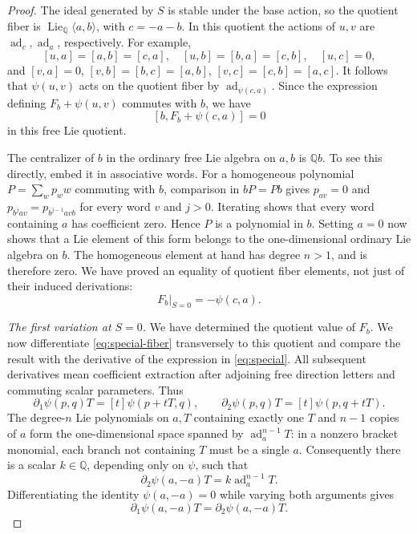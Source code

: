 \documentclass[11pt]{article}
\theoremstyle{definition}
\theoremstyle{remark}
\numberwithin{equation}{section}
\begin{document}
\begin{proof}
The ideal generated by \(S\) is stable under the base action, so the
quotient fiber is \(\operatorname{Lie}_{\mathbb Q}\langle a,b\rangle\), with
\(c=-a-b\).  In this quotient the actions of \(u,v\) are
\(\operatorname{ad}_c,\operatorname{ad}_a\), respectively.  For example,
\[
 [u,a]=[a,b]=[c,a],\quad [u,b]=[b,a]=[c,b],\quad [u,c]=0,
\]
and
\([v,a]=0\), \([v,b]=[b,c]=[a,b]\),
\([v,c]=[c,b]=[a,c]\).  It follows that \(\psi(u,v)\) acts on
the quotient fiber by \(\operatorname{ad}_{\psi(c,a)}\).  Since the expression
defining \(F_b+\psi(u,v)\) commutes with \(b\), we have
\[
 [b,F_b+\psi(c,a)]=0
\]
in this free Lie quotient.

The centralizer of \(b\) in the ordinary free Lie algebra on \(a,b\)
is \(\mathbb Q b\).  To see this directly, embed it in associative words.
For a homogeneous polynomial \(P=\sum_w p_w w\) commuting with
\(b\), comparison in \(bP=Pb\) gives
\(p_{av}=0\) and
\(p_{b^j av}=p_{b^{j-1}avb}\) for every word \(v\) and \(j>0\).
Iterating shows that every word containing \(a\) has coefficient
zero.  Hence \(P\) is a polynomial in \(b\).  Setting \(a=0\) now shows that a
Lie element of this form belongs to the one-dimensional ordinary
Lie algebra on \(b\).  The homogeneous element at hand has degree
\(n>1\), and is therefore zero.  We have proved an equality of
quotient fiber elements, not just of their induced derivations:
\begin{equation}\label{eq:special-fb}
 F_b\big|_{S=0}=-\psi(c,a).
\end{equation}

\emph{The first variation at \(S=0\).}
We have determined the quotient value of \(F_b\).  We now differentiate
\eqref{eq:special-fiber} transversely to this quotient and compare the
result with the derivative of the expression in \eqref{eq:special}.
All subsequent derivatives mean coefficient
extraction after adjoining free direction letters and commuting
scalar parameters.  Thus
\[
 \partial_1\psi(p,q)T=[t]\psi(p+tT,q),\qquad
 \partial_2\psi(p,q)T=[t]\psi(p,q+tT).
\]
The degree-\(n\) Lie polynomials on \(a,T\) containing exactly one
\(T\) and \(n-1\) copies of \(a\) form the one-dimensional space
spanned by \(\operatorname{ad}_a^{n-1}T\): in a nonzero bracket monomial, each
branch not containing \(T\) must be a single \(a\).  Consequently
there is a scalar \(k\in\mathbb Q\), depending only on \(\psi\), such that
\begin{equation}\label{eq:special-k}
 \partial_2\psi(a,-a)T=k\operatorname{ad}_a^{n-1}T.
\end{equation}
Differentiating the identity \(\psi(a,-a)=0\) while varying both
arguments gives
\begin{equation}\label{eq:special-diagonal}
 \partial_1\psi(a,-a)T=\partial_2\psi(a,-a)T.
\end{equation}


\end{proof}
\end{document}
